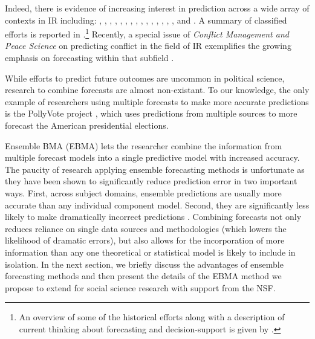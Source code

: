 \documentclass[pdftex,12pt,fullpage,oneside]{amsart}
\begin{document}
Indeed, there is evidence of increasing interest in prediction across a
wide array of contexts in IR including:
\citet{Krause:1997}, \citet{Davies:Gurr:1998},
\citet{Pevehouse:Goldstein:1999}, \citet{Schrodt:Gerner:2000},
\citet{King:Zeng:2001}, \citet{OBrien:2002}, \citet{BDM:2002},
\citet{Fearon:Laitin:2003}, \citet{Demarchi:etal:2004},
\citet{Ruger:2004}, \citet{Enders:Sandler:2005},
\citet{Leblang:Satyanath:2006}, \citet{Ward:etal:2007},
\citet{Brandt:etal:2008}, \citet{Bennett:Stam:2009}, and
\citet{Gleditsch:Ward:2010}. A summary of classified efforts is
reported in \citet{Feder:2002}.\footnote{An overview of some of the
  historical efforts along with a description of current thinking
  about forecasting and decision-support is given by
  \citet{OBrien:2010}.}  Recently, a special issue of \emph{Conflict
  Management and Peace Science} on predicting conflict in the field of
IR exemplifies the growing emphasis on forecasting within that
subfield \citep[c.f.,][]{Schneider_etal_2011, Mesquita_2011,
  Brandt_etal_2011}.

While efforts to predict future outcomes are uncommon in political
science, research to combine forecasts are almost non-existant.  To
our knowledge, the only example of researchers using multiple
forecasts to make more accurate predictions is the PollyVote project
\citep[c.f.][]{Graefe:2010}, which uses predictions from multiple
sources to more forecast the American presidential elections.

Ensemble BMA (EBMA) lets the researcher combine the information from multiple forecast models into a single predictive model with increased accuracy. The paucity of research applying ensemble forecasting methods is
unfortunate as they have been shown to significantly reduce prediction
error in two important ways.  First, across subject domains, ensemble
predictions are usually more accurate than any individual component
model. Second, they are significantly less likely to make dramatically
incorrect predictions \citep{Armstrong:2001, Raftery:2005}.  Combining
forecasts not only reduces reliance on single data sources and
methodologies (which lowers the likelihood of dramatic errors), but
also allows for the incorporation of more information than any one
theoretical or statistical model is likely to include in isolation.
In the next section, we briefly discuss the advantages of ensemble
forecasting methods and then present the details of the EBMA method we
propose to extend for social science research with support from the
NSF.
\end{document}
